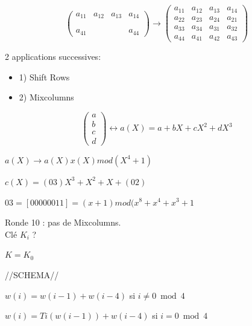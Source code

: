 \documentclass[12pt,a4paper]{article}
\begin{document}
\begin{displaymath}
\begin{pmatrix}
a_{11} & a_{12} & a_{13} & a_{14} \\ 
 &  &  &  \\ 
 &  &  &  \\ 
a_{41} &  &  & a_{44}
\end{pmatrix} 
\longrightarrow
\begin{pmatrix}
a_{11} & a_{12} & a_{13} & a_{14} \\ 
a_{22} & a_{23} & a_{24} & a_{21} \\ 
a_{33} & a_{34} & a_{31} & a_{32} \\ 
a_{44} & a_{41} & a_{42} & a_{43}
\end{pmatrix} 
\end{displaymath}

2 applications successives:

\begin{itemize}
\item 1) Shift Rows
\item 2) Mixcolumns
\end{itemize} 

\begin{displaymath}
\begin{pmatrix}
a \\ 
b \\ 
c \\ 
d
\end{pmatrix} 
\longleftrightarrow
a(X) = a+ bX + cX^2 + dX^3
\end{displaymath}

$a(X) \rightarrow a(X) x(X) mod (X^4 +1)$

$c(X) = (03)X^3 + X^2 + X + (02)$

$03 = [00000011] = (x+1) mod (x^8+x^4+x^3+1$

Ronde 10 : pas de Mixcolumns.\\

Clé $K_i$ ?

$K=K_0$

//SCHEMA//

$w(i)=w(i-1)+w(i-4)$ si $i\neq 0 \bmod{4}$

$w(i)=Ti(w(i-1))+w(i-4)$ si $i=0 \bmod{4}$
\\
\end{document}
